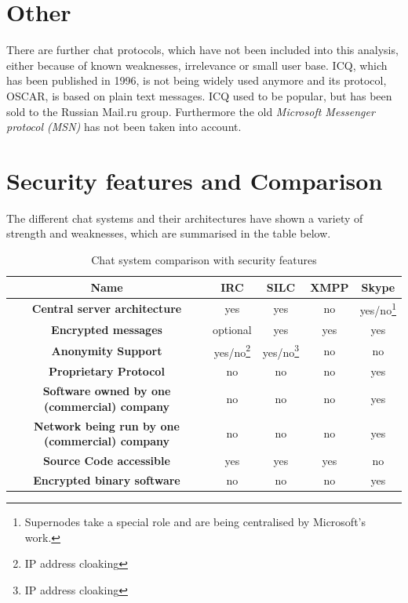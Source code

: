 \section{Other}
There are further chat protocols, which have not been included into this
analysis, either because of known weaknesses, irrelevance or small user base.
ICQ, which has been published in 1996, is not being widely used anymore
and its protocol, OSCAR\cite{oscar}, is based on plain text messages.
ICQ used to be popular, but has been sold to the Russian Mail.ru group.
Furthermore the old \textit{Microsoft Messenger protocol (MSN)} has not
been taken into account.
\section{Security features and Comparison}
The different chat systems and their architectures have shown a variety
of strength and weaknesses, which are summarised in the table below.
\begin{longtable}{|c|c|c|c|c|}
\caption{Chat system comparison with security features}\\
\hline
\textbf{Name} & \textbf{IRC} & \textbf{SILC} & \textbf{XMPP} & \textbf{Skype}\\
\hline
\textbf{Central server architecture} & yes & yes & no & yes/no\footnote{Supernodes take a special role and are
being centralised by Microsoft's work.}\\
\hline
\textbf{Encrypted messages} & optional & yes & yes & yes\\
\hline
\textbf{Anonymity Support} & yes/no\footnote{IP address cloaking}  & yes/no\footnote{IP address cloaking} & no & no\\
\hline
\textbf{Proprietary Protocol} & no  & no & no & yes\\
\hline
\textbf{Software owned by one (commercial) company} & no  & no & no & yes\\
\hline
\textbf{Network being run by one (commercial) company} & no  & no & no & yes\\
\hline
\textbf{Source Code accessible} & yes  & yes & yes & no\\
\hline
\textbf{Encrypted binary software} & no  & no & no & yes\\
\hline
\end{longtable}
